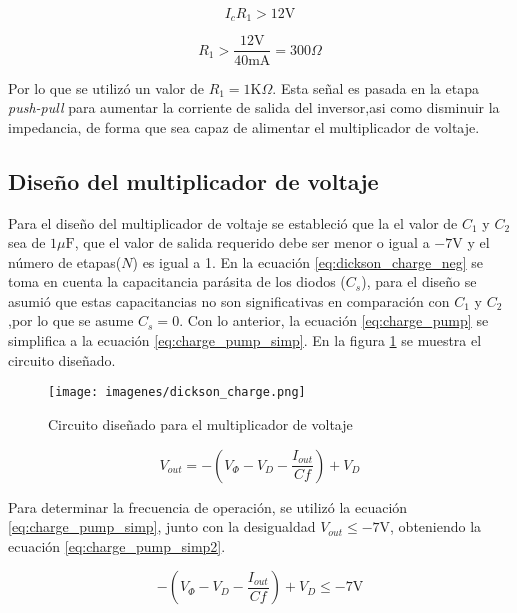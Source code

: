     $$
        I_cR_1 > 12\text{V}
    $$
    
   
    $$
        R_1 > \frac{12\text{V}}{40\text{mA}} = 300 \Omega
    $$

    
    Por lo que se utilizó un valor de $R_1 = 1\text{K}\Omega$. Esta señal es 
    pasada en la etapa \textit{push-pull} para aumentar la corriente de salida
    del inversor,asi como disminuir la impedancia, de forma que sea 
    capaz de alimentar el multiplicador de voltaje.

    \subsection{Diseño del multiplicador de voltaje}

    Para el diseño del multiplicador de voltaje se estableció que la 
    el valor de $C_1$ y $C_2$ sea de
    $1\mu\text{F}$, que el valor de salida requerido debe ser menor o igual
    a $-7\text{V}$ y el número de etapas($N$) es igual a 1. En la 
    ecuación \ref{eq:dickson_charge_neg}  se toma en cuenta la
    capacitancia parásita de los diodos ($C_s$), para el diseño se asumió
    que estas capacitancias no son significativas en comparación con 
    $C_1$ y $C_2$,por lo que se asume $C_s = 0$.
    Con lo anterior, la ecuación \ref{eq:charge_pump} se simplifica a la
    ecuación \ref{eq:charge_pump_simp}. En la figura \ref{fig:charge_pump_dis}
    se muestra el circuito diseñado.

    \begin{figure}[H]
        \centering
        \texttt{[image: imagenes/dickson\_charge.png]}
        \caption{Circuito diseñado para el multiplicador de voltaje}
        \label{fig:charge_pump_dis}
    \end{figure}

    \begin{equation}
        V_{out} = -\left(V_\Phi - V_D - \frac{I_{out}}{Cf}  \right) + V_D
        \label{eq:charge_pump_simp}
    \end{equation}

    Para determinar la frecuencia de operación, se utilizó la ecuación 
    \ref{eq:charge_pump_simp}, junto con la desigualdad 
    $V_{out} \leq -7\text{V}$, obteniendo la ecuación 
    \ref{eq:charge_pump_simp2}.

    \begin{equation}
        -\left(V_\Phi - V_D - \frac{I_{out}}{Cf}\right) + V_D \leq -7\text{V}
        \label{eq:charge_pump_simp2}    
    \end{equation}

